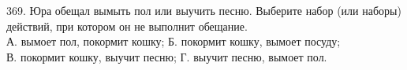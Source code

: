 369. Юра обещал вымыть пол или выучить песню. Выберите набор (или наборы) действий, при котором он не выполнит обещание.\\
А. вымоет пол, покормит кошку;  \qquad \qquad Б. покормит кошку, вымоет посуду;\\
В. покормит кошку, выучит песню; \qquad \quad Г. выучит песню, вымоет пол.\\
